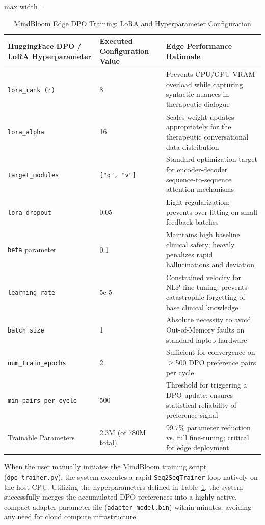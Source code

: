 \documentclass[12pt,twoside]{article}
\begin{document}
\begin{table}[htbp]
\centering
\Large
\renewcommand{\arraystretch}{2.4}
\setlength{\tabcolsep}{12pt}
\begin{adjustbox}{max width=\textwidth}
\begin{tabular}{|p{5.5cm}|p{4.5cm}|p{9.5cm}|}
\hline
\rowcolor{gray!20}
\textbf{HuggingFace DPO / LoRA Hyperparameter} & \textbf{Executed Configuration Value} & \textbf{Edge Performance Rationale} \\
\hline
\texttt{lora\_rank (r)} & 8 & Prevents CPU/GPU VRAM overload while capturing syntactic nuances in therapeutic dialogue \\
\hline
\texttt{lora\_alpha} & 16 & Scales weight updates appropriately for the therapeutic conversational data distribution \\
\hline
\texttt{target\_modules} & \texttt{["q", "v"]} & Standard optimization target for encoder-decoder sequence-to-sequence attention mechanisms \\
\hline
\texttt{lora\_dropout} & 0.05 & Light regularization; prevents over-fitting on small feedback batches \\
\hline
\texttt{beta} parameter & 0.1 & Maintains high baseline clinical safety; heavily penalizes rapid hallucinations and deviation \\
\hline
\texttt{learning\_rate} & 5e-5 & Constrained velocity for NLP fine-tuning; prevents catastrophic forgetting of base clinical knowledge \\
\hline
\texttt{batch\_size} & 1 & Absolute necessity to avoid Out-of-Memory faults on standard laptop hardware \\
\hline
\texttt{num\_train\_epochs} & 2 & Sufficient for convergence on $\geq$500 DPO preference pairs per cycle \\
\hline
\texttt{min\_pairs\_per\_cycle} & 500 & Threshold for triggering a DPO update; ensures statistical reliability of preference signal \\
\hline
Trainable Parameters & 2.3M (of 780M total) & 99.7\% parameter reduction vs. full fine-tuning; critical for edge deployment \\
\hline
\end{tabular}
\end{adjustbox}
\caption{MindBloom Edge DPO Training: LoRA and Hyperparameter Configuration}
\label{tab:lora}
\end{table}

When the user manually initiates the MindBloom training script (\texttt{dpo\_trainer.py}), the system executes a rapid \texttt{Seq2SeqTrainer} loop natively on the host CPU. Utilizing the hyperparameters defined in Table~\ref{tab:lora}, the system successfully merges the accumulated DPO preferences into a highly active, compact adapter parameter file (\texttt{adapter\_model.bin}) within minutes, avoiding any need for cloud compute infrastructure.
\end{document}
